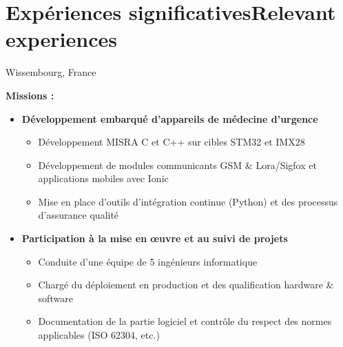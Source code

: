 \section{\ifnativelang Exp\'eriences significatives\else Relevant experiences\fi}

{}{}{Wissembourg, France}{
\ifnativelang
	\textcolor{color1}{\textbf{Missions :}}
	\begin{itemize}[leftmargin=\ListItemsMargins]
		\item \textbf{Développement embarqué d'appareils de médecine d’urgence}
		\begin{itemize}
			\item D\'eveloppement MISRA C et C++ sur cibles STM32 et IMX28
			\item D\'eveloppement de modules communicants GSM \& Lora/Sigfox et applications mobiles avec Ionic
			\item Mise en place d'outils d'intégration continue (Python) et des processus d'assurance qualit\'e
		\end{itemize}
		\item \textbf{Participation \`a la mise en \oe uvre et au suivi de projets}
		\begin{itemize}
			\ifaddmngt \item Conduite d’une équipe de 5 ingénieurs informatique  \fi
			\item Chargé du déploiement en production et des qualification hardware \& software
			\item Documentation de la partie logiciel et contrôle du respect des normes applicables (ISO 62304, etc.)
		\end{itemize}
	\end{itemize}
	\vspace{\ItemsMinSpacing}
}
